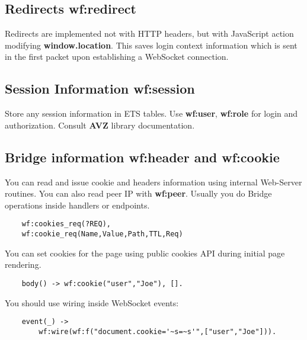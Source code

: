 \subsection{Redirects {\bf wf:redirect}}
Redirects are implemented not with HTTP headers, but with JavaScript action modifying {\bf window.location}.
This saves login context information which is sent in the first packet upon establishing a WebSocket connection.

\subsection{Session Information {\bf wf:session}}
Store any session information in ETS tables. Use {\bf wf:user}, {\bf wf:role} for
login and authorization. Consult {\bf AVZ} library documentation.

\subsection{Bridge information {\bf wf:header} and {\bf wf:cookie}}
You can read and issue cookie and headers information using internal Web-Server routines.
You can also read peer IP with {\bf wf:peer}. Usually you do Bridge operations
inside handlers or endpoints.

\begin{lstlisting}
    wf:cookies_req(?REQ),
    wf:cookie_req(Name,Value,Path,TTL,Req)
\end{lstlisting}

You can set cookies for the page using public cookies API during initial page rendering.

\begin{lstlisting}
    body() -> wf:cookie("user","Joe"), [].
\end{lstlisting}

You should use wiring inside WebSocket events:

\begin{lstlisting}
    event(_) ->
        wf:wire(wf:f("document.cookie='~s=~s'",["user","Joe"])).
\end{lstlisting}
